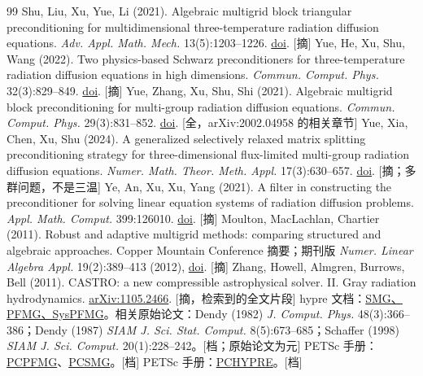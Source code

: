 \documentclass[11pt,a4paper]{ctexart}
\begin{document}
\begin{thebibliography}{99}
\small
{} Shu, Liu, Xu, Yue, Li (2021). Algebraic multigrid block triangular preconditioning for multidimensional three-temperature radiation diffusion equations. \emph{Adv. Appl. Math. Mech.} 13(5):1203--1226. \href{https://doi.org/10.4208/aamm.OA-2020-0210}{doi}. [摘]
 Yue, He, Xu, Shu, Wang (2022). Two physics-based Schwarz preconditioners for three-temperature radiation diffusion equations in high dimensions. \emph{Commun. Comput. Phys.} 32(3):829--849. \href{https://doi.org/10.4208/cicp.OA-2021-0223}{doi}. [摘]
 Yue, Zhang, Xu, Shu, Shi (2021). Algebraic multigrid block preconditioning for multi-group radiation diffusion equations. \emph{Commun. Comput. Phys.} 29(3):831--852. \href{https://doi.org/10.4208/cicp.OA-2020-0030}{doi}. [全，arXiv:2002.04958 的相关章节]
 Yue, Xia, Chen, Xu, Shu (2024). A generalized selectively relaxed matrix splitting preconditioning strategy for three-dimensional flux-limited multi-group radiation diffusion equations. \emph{Numer. Math. Theor. Meth. Appl.} 17(3):630--657. \href{https://doi.org/10.4208/nmtma.OA-2023-0098}{doi}. [摘；多群问题，不是三温]
 Ye, An, Xu, Xu, Yang (2021). A filter in constructing the preconditioner for solving linear equation systems of radiation diffusion problems. \emph{Appl. Math. Comput.} 399:126010. \href{https://doi.org/10.1016/j.amc.2021.126010}{doi}. [摘]
 Moulton, MacLachlan, Chartier (2011). Robust and adaptive multigrid methods: comparing structured and algebraic approaches. Copper Mountain Conference 摘要；期刊版 \emph{Numer. Linear Algebra Appl.} 19(2):389--413 (2012), \href{https://doi.org/10.1002/nla.837}{doi}. [摘]
 Zhang, Howell, Almgren, Burrows, Bell (2011). CASTRO: a new compressible astrophysical solver. II. Gray radiation hydrodynamics. \href{https://arxiv.org/abs/1105.2466}{arXiv:1105.2466}. [摘，检索到的全文片段]
 hypre 文档：\href{https://hypre.readthedocs.io/en/latest/solvers-smg-pfmg.html}{SMG、PFMG、SysPFMG}。相关原始论文：Dendy (1982) \emph{J. Comput. Phys.} 48(3):366--386；Dendy (1987) \emph{SIAM J. Sci. Stat. Comput.} 8(5):673--685；Schaffer (1998) \emph{SIAM J. Sci. Comput.} 20(1):228--242。[档；原始论文为元]
 PETSc 手册：\href{https://petsc.org/release/manualpages/PC/PCPFMG/}{PCPFMG}、\href{https://petsc.org/release/manualpages/PC/PCSMG/}{PCSMG}。[档]
 PETSc 手册：\href{https://petsc.org/release/manualpages/PC/PCHYPRE/}{PCHYPRE}。[档]

\end{thebibliography}
\end{document}

